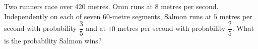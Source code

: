 Two runners race over $420$ metres. Oron runs at $8$ metres per second. Independently on each of seven $60$-metre segments, Salmon runs at $5$ metres per second with probability $\dfrac{3}{5}$ and at $10$ metres per second with probability $\dfrac{2}{5}$. What is the probability Salmon wins?
